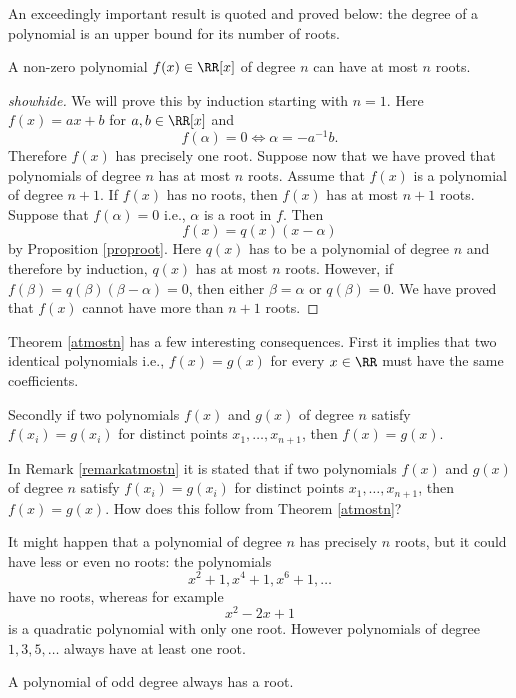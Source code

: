 \documentclass{article}
\begin{document}
  An exceedingly important result is quoted and proved below: the degree of a polynomial is
  an upper bound for its number of roots.

  
\begin{theorem}[emph]\label{atmostn}
  A non-zero polynomial $f(x)\in \RR[x]$ of degree $n$ can have at most $n$ roots.
\end{theorem}
\begin{proof}[showhide]
We will prove this by induction starting with $n = 1$. Here
$f(x) = a x + b$ for $a, b\in \RR[x]$ and
$$
f(\alpha) = 0\iff \alpha = - a^{-1} b.
$$
Therefore $f(x)$ has precisely one root. Suppose now that we have proved that
polynomials of degree $n$ has at most $n$ roots. Assume that 
$f(x)$ is a polynomial of degree $n + 1$. If $f(x)$ has no roots, then
$f(x)$ has at most $n+1$ roots. Suppose that $f(\alpha) = 0$ i.e.,
$\alpha$ is a root in $f$. Then
$$
f(x) = q(x) (x-\alpha)
$$
by Proposition \ref{proproot}. Here $q(x)$ has to be a polynomial of degree $n$ and
therefore by induction, $q(x)$ has at most $n$ roots. However, if $f(\beta) = q(\beta) (\beta - \alpha) = 0$,
then either $\beta = \alpha$ or $q(\beta) = 0$. We have proved that 
$f(x)$ cannot have more than $n+1$ roots.
\end{proof}


\begin{remark}\label{remarkatmostn}
  Theorem \ref{atmostn} has a few interesting consequences. First it implies that two
  identical polynomials i.e., $f(x) = g(x)$ for every $x\in \RR$ must have
  the same coefficients.

  Secondly if two polynomials $f(x)$ and $g(x)$ of degree $n$ satisfy
  $f(x_i) = g(x_i)$ for distinct points $x_1, \dots, x_{n+1}$, then
  $f(x) = g(x)$.
\end{remark}

\beginshex
In Remark \ref{remarkatmostn} it is stated that if two polynomials $f(x)$ and $g(x)$ of degree $n$ satisfy
  $f(x_i) = g(x_i)$ for distinct points $x_1, \dots, x_{n+1}$, then
  $f(x) = g(x)$. How does this follow from Theorem \ref{atmostn}?
\endshex

It might happen that a  polynomial of degree $n$ has precisely $n$ roots, but it could have less or
even no roots: the polynomials
$$
x^2 + 1, x^4 + 1, x^6 + 1, \dots
$$
have no roots, whereas for example
$$
x^2 - 2 x + 1
$$
is a quadratic polynomial with only one root. However polynomials of degree $1, 3, 5, \dots$ always have at 
least one root.

\begin{theorem}[emph]
A polynomial of odd degree always has a root.
\end{theorem}
\end{document}
